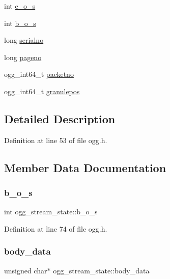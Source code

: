 \begin{DoxyCompactItemize}
int \mbox{\hyperlink{structogg__stream__state_a366e94e72849e0e880d53a22bb9ee646}{e\+\_\+o\+\_\+s}}
\item 
int \mbox{\hyperlink{structogg__stream__state_a76fcc3bf6a59eff87ec3bee1d16fa0b5}{b\+\_\+o\+\_\+s}}
\item 
long \mbox{\hyperlink{structogg__stream__state_a79248e3f1f41cde5331909e8edd98e10}{serialno}}
\item 
long \mbox{\hyperlink{structogg__stream__state_a0ad3315203fcebdc2ccd3b050d28a65c}{pageno}}
\item 
ogg\+\_\+int64\+\_\+t \mbox{\hyperlink{structogg__stream__state_a1bebf380025b6ca0841497e7ab2b5c34}{packetno}}
\item 
ogg\+\_\+int64\+\_\+t \mbox{\hyperlink{structogg__stream__state_a5df750c600660686e29f24b4d1ce836c}{granulepos}}
\end{DoxyCompactItemize}


\subsection{Detailed Description}


Definition at line 53 of file ogg.\+h.



\subsection{Member Data Documentation}
\mbox{\label{structogg__stream__state_a76fcc3bf6a59eff87ec3bee1d16fa0b5}} 
\subsubsection{\texorpdfstring{b\_o\_s}{b\_o\_s}}
{\footnotesize\ttfamily int ogg\+\_\+stream\+\_\+state\+::b\+\_\+o\+\_\+s}



Definition at line 74 of file ogg.\+h.

\mbox{\label{structogg__stream__state_a70d03b6f99c1d1e57f55e800b087dae8}} 
\subsubsection{\texorpdfstring{body\_data}{body\_data}}
{\footnotesize\ttfamily unsigned char$\ast$ ogg\+\_\+stream\+\_\+state\+::body\+\_\+data}



